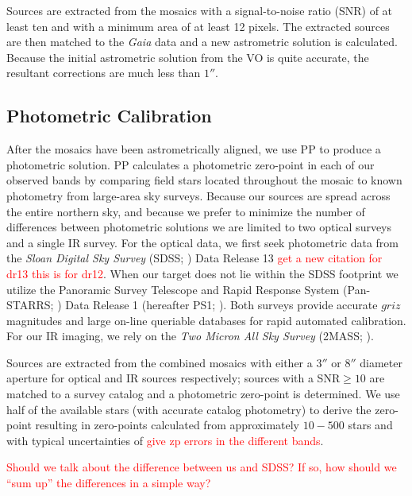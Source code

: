 \documentclass[apj, revtex4]{emulateapj}
\newcommand{\editorial}[1]{\textcolor{red}{#1}}
\begin{document}
Sources are extracted from the mosaics with a signal-to-noise ratio (SNR) of at least ten and with a minimum area of at least 12 pixels. The extracted sources are then matched to the \textit{Gaia} data and a new astrometric solution is calculated. Because the initial astrometric solution from the VO is quite accurate, the resultant corrections are much less than $1''$.

\subsection{Photometric Calibration}
After the mosaics have been astrometrically aligned, we use PP to produce a photometric solution. PP calculates a photometric zero-point in each of our observed bands by comparing field stars located throughout the mosaic to known photometry from large-area sky surveys. Because our sources are spread across the entire northern sky, and because we prefer to minimize the number of differences between photometric solutions we are limited to two optical surveys and a single IR survey. For the optical data, we first seek photometric data from the \textit{Sloan Digital Sky Survey} (SDSS; \citealt{York2000}) Data Release 13 \citep{Alam2015} \editorial{get a new citation for dr13 this is for dr12}. When our target does not lie within the SDSS footprint we utilize the Panoramic Survey Telescope and Rapid Response System (Pan-STARRS; \citealt{Chambers2016}) Data Release 1 (hereafter PS1; \citealt{Flewelling2016}). Both surveys provide accurate $griz$ magnitudes and large on-line queriable databases for rapid automated calibration. For our IR imaging, we rely on the \textit{Two Micron All Sky Survey} (2MASS; \citealt{Skrutskie2006}).

Sources are extracted from the combined mosaics with either a $3''$ or $8''$ diameter aperture for optical and IR sources respectively; sources with a SNR$\ge10$ are matched to a survey catalog and a photometric zero-point is determined. We use half of the available stars (with accurate catalog photometry) to derive the zero-point resulting in zero-points calculated from approximately $10-500$ stars and with typical uncertainties of \editorial{give zp errors in the different bands}.

\editorial{Should we talk about the difference between us and SDSS? If so, how should we ``sum up'' the differences in a simple way?} 
\end{document}
